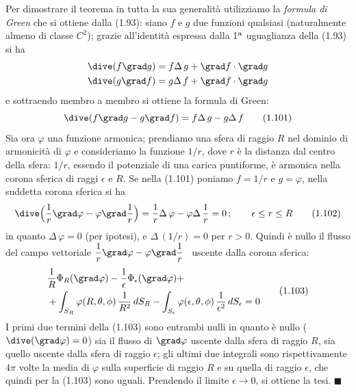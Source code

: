Per dimostrare il teorema in tutta la sua generalit\`a utilizziamo la
\emph{formula di Green} che si ottiene dalla (1.93): siano $f$ e $g$ due
funzioni qualsiasi (naturalmente almeno di classe $C^2$); grazie all'identit\`a
espressa dalla 1$^{\rm a}$ uguaglianza della (1.93) si ha
\[
  \begin{aligned}
    \dive(f\grad g)&=f\Delta\,g+\grad f\cdot\grad g\\
    \dive(g\grad f)&=g\Delta\,f+\grad f\cdot\grad g
  \end{aligned}
\]
e sottraendo membro a membro si ottiene la formula di Green:
\begin{equation}
  \dive(f\grad g-g\grad f)=f\Delta\,g-g\Delta\,f
  \tag{1.101}
\end{equation}
Sia ora $\varphi$ una funzione armonica; prendiamo una sfera di raggio $R$ nel
dominio di armonicit\`a di $\varphi$ e consideriamo la funzione $1/r$, dove $r$
\`e la distanza dal centro della sfera: $1/r$, essendo il potenziale di una
carica puntiforme, \`e armonica nella corona sferica di raggi $\epsilon$ e $R$.
Se nella (1.101) poniamo $f=1/r$ e $g=\varphi$, nella suddetta corona sferica si
ha
\begin{equation}
  \dive\Big(\frac1r\grad\varphi-\varphi\grad\frac1r\Big)=\frac1r\Delta\,\varphi
  -\varphi\Delta\,\frac1r=0\,;\qquad\epsilon\le r\le R
  \tag{1.102}
\end{equation}
in quanto $\Delta\,\varphi=0$ (per ipotesi), e $\Delta\,(1/r)=0$ per $r>0$.
Quindi \`e nullo il flusso del
campo vettoriale $\dfrac1r\grad\varphi-\varphi\grad\dfrac1r$ \ uscente dalla
corona sferica:
\begin{equation}
  \begin{split}
    &\frac1R\Phi_R(\grad\varphi)-\frac1\epsilon\Phi_\epsilon(\grad\varphi)+\\
    &+\int_{S_R}\varphi(R,\theta,\phi)\,\frac{1}{R^2}\,dS_R
    -\int_{S_\epsilon}\varphi(\epsilon,\theta,\phi)\,
    \frac{1}{\epsilon^2}\,dS_\epsilon=0
  \end{split}
  \tag{1.103}
\end{equation}
I primi due termini della (1.103) sono entrambi nulli in quanto \`e nullo
\big($\dive(\grad\varphi)=0$\big) sia il flusso di $\grad\varphi$ uscente dalla
sfera di raggio $R$, sia quello uscente dalla sfera di raggio $\epsilon$; gli
ultimi due integrali sono rispettivamente $4\pi$ volte la media di $\varphi$
sulla superficie di raggio $R$ e su quella di raggio $\epsilon$, che quindi per
la (1.103) sono uguali. Prendendo il limite $\epsilon\to0$, si ottiene la tesi.
$\blacksquare$

